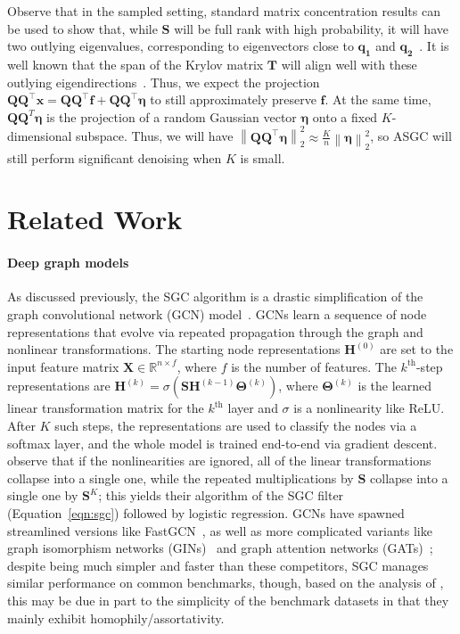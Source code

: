 \documentclass{article}
\newcommand{\norm}[1]{\left\lVert#1\right\rVert}
\begin{document}
%
Observe that in the sampled setting, standard matrix concentration results can be used to show that, while $\bm S$ will be full rank with high probability, it will have two outlying eigenvalues, corresponding to eigenvectors close to $\bm{q_1}$ and $\bm{q_2}$~\citep{spielman2012spectral}. It is well known that the span of the Krylov matrix $\bm T$ will align well with these outlying eigendirections~\citep{saad2011numerical}. Thus, we expect the projection $\bm{Q} \bm{Q}^\top \bm{x} = \bm{Q} \bm{Q}^\top \bm{f} + \bm{Q} \bm{Q}^\top \bm{\eta}$ to still approximately preserve $\bm{f}$. At the same time, $\bm Q\bm Q^T \bm \eta$ is the projection of a random Gaussian vector $\bm \eta$ onto a fixed $K$-dimensional subspace. Thus, we will have $\norm{\bm Q \bm Q^\top \bm{\eta}}_2^2 \approx \frac{K}{n} \norm{\bm{\eta}}_2^2$, so ASGC will still perform significant denoising when $K$ is small.

\section{Related Work}\label{sec:related}

\paragraph{Deep graph models} As discussed previously, the SGC algorithm is a drastic simplification of the graph convolutional network (GCN) model~\citep{kipf2016semi}. GCNs learn a sequence of node representations that evolve via repeated propagation through the graph and nonlinear transformations. The starting node representations $\bm{H}^{(0)}$ are set to the input feature matrix $\bm{X}\in\mathbb{R}^{n \times f}$, where $f$ is the number of features. The $k^\text{th}$-step representations are $\bm{H}^{(k)} = \sigma\left( \bm{S} \bm{H}^{(k-1)} \bm{\Theta}^{(k)} \right)$, where $\bm{\Theta}^{(k)}$ is the learned linear transformation matrix for the $k^\text{th}$ layer and $\sigma$ is a nonlinearity like ReLU. After $K$ such steps, the representations are used to classify the nodes via a softmax layer, and the whole model is trained end-to-end via gradient descent.
\citet{wu2019simplifying} observe that if the nonlinearities are ignored, all of the linear transformations collapse into a single one, while the repeated multiplications by $\bm{S}$ collapse into a single one by $\bm{S}^K$; this yields their algorithm of the SGC filter (Equation~\ref{eqn:sgc}) followed by logistic regression.
GCNs have spawned streamlined versions like FastGCN~\citep{chen2018fastgcn}, as well as more complicated variants like graph isomorphism networks (GINs)~\citep{xu2018powerful} and graph attention networks (GATs)~\citep{velivckovic2018graph}; despite being much simpler and faster than these competitors, SGC manages similar performance on common benchmarks, though, based on the analysis of \citet{nt2019revisiting}, this may be due in part to the simplicity of the benchmark datasets in that they mainly exhibit homophily/assortativity.
\end{document}
